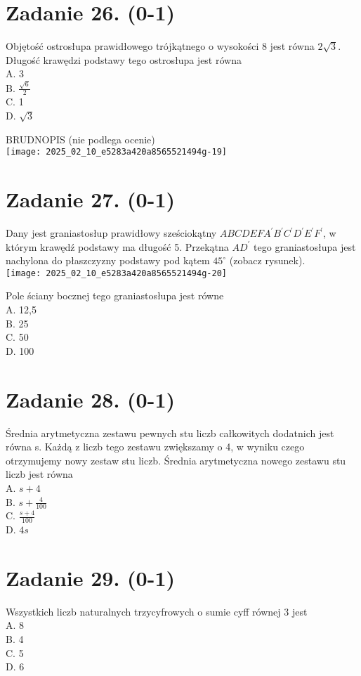 \documentclass[10pt]{article}
\begin{document}
\section*{Zadanie 26. (0-1)}
Objętość ostrosłupa prawidłowego trójkątnego o wysokości 8 jest równa \(2 \sqrt{3}\). Długość krawędzi podstawy tego ostrosłupa jest równa\\
A. 3\\
B. \(\frac{\sqrt{6}}{2}\)\\
C. 1\\
D. \(\sqrt{3}\)

BRUDNOPIS (nie podlega ocenie)\\
\texttt{[image: 2025\_02\_10\_e5283a420a8565521494g-19]}

\section*{Zadanie 27. (0-1)}
Dany jest graniastosłup prawidłowy sześciokątny \(A B C D E F A^{\prime} B^{\prime} C^{\prime} D^{\prime} E^{\prime} F^{\prime}\), w którym krawędź podstawy ma długość 5. Przekątna \(A D^{\prime}\) tego graniastosłupa jest nachylona do płaszczyzny podstawy pod kątem \(45^{\circ}\) (zobacz rysunek).\\
\texttt{[image: 2025\_02\_10\_e5283a420a8565521494g-20]}

Pole ściany bocznej tego graniastosłupa jest równe\\
A. 12,5\\
B. 25\\
C. 50\\
D. 100

\section*{Zadanie 28. (0-1)}
Średnia arytmetyczna zestawu pewnych stu liczb całkowitych dodatnich jest równa s. Każdą z liczb tego zestawu zwiększamy o 4, w wyniku czego otrzymujemy nowy zestaw stu liczb. Średnia arytmetyczna nowego zestawu stu liczb jest równa\\
A. \(s+4\)\\
B. \(s+\frac{4}{100}\)\\
C. \(\frac{s+4}{100}\)\\
D. \(4 s\)

\section*{Zadanie 29. (0-1)}
Wszystkich liczb naturalnych trzycyfrowych o sumie cyff równej 3 jest\\
A. 8\\
B. 4\\
C. 5\\
D. 6
\end{document}
